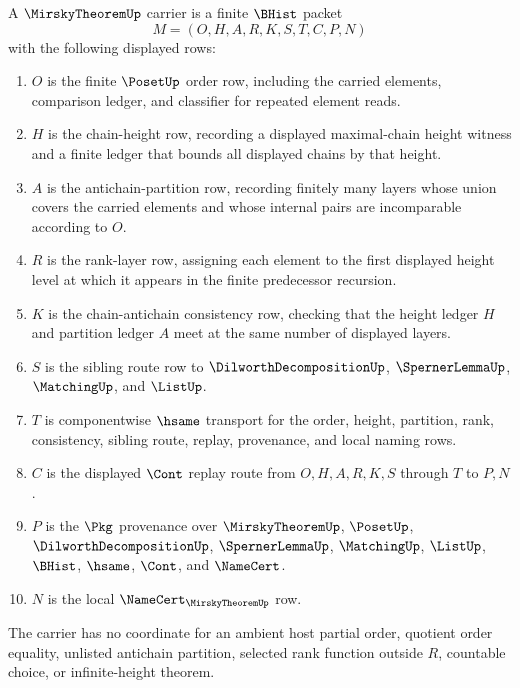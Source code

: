 \begin{definition}
\label{def:mirsky-theorem-carrier}
A $\MirskyTheoremUp$ carrier is a finite $\BHist$ packet
$$
M=(O,H,A,R,K,S,T,C,P,N)
$$
with the following displayed rows:
\begin{enumerate}
\item $O$ is the finite $\PosetUp$ order row, including the carried elements, comparison ledger, and classifier for repeated element reads.
\item $H$ is the chain-height row, recording a displayed maximal-chain height witness and a finite ledger that bounds all displayed chains by that height.
\item $A$ is the antichain-partition row, recording finitely many layers whose union covers the carried elements and whose internal pairs are incomparable according to $O$.
\item $R$ is the rank-layer row, assigning each element to the first displayed height level at which it appears in the finite predecessor recursion.
\item $K$ is the chain-antichain consistency row, checking that the height ledger $H$ and partition ledger $A$ meet at the same number of displayed layers.
\item $S$ is the sibling route row to $\DilworthDecompositionUp$, $\SpernerLemmaUp$, $\MatchingUp$, and $\ListUp$.
\item $T$ is componentwise $\hsame$ transport for the order, height, partition, rank, consistency, sibling route, replay, provenance, and local naming rows.
\item $C$ is the displayed $\Cont$ replay route from $O,H,A,R,K,S$ through $T$ to $P,N$.
\item $P$ is the $\Pkg$ provenance over $\MirskyTheoremUp$, $\PosetUp$, $\DilworthDecompositionUp$, $\SpernerLemmaUp$, $\MatchingUp$, $\ListUp$, $\BHist$, $\hsame$, $\Cont$, and $\NameCert$.
\item $N$ is the local $\NameCert_{\MirskyTheoremUp}$ row.
\end{enumerate}
The carrier has no coordinate for an ambient host partial order, quotient order equality, unlisted antichain partition, selected rank function outside $R$, countable choice, or infinite-height theorem.
\end{definition}

